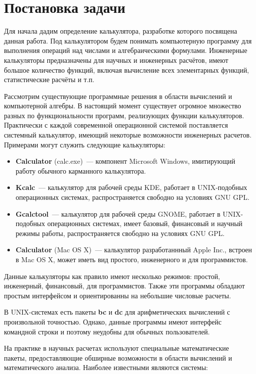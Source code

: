 \section{Постановка задачи}
Для начала дадим определение калькулятора, разработке 
которого посвящена данная работа. Под калькулятором будем 
понимать компьютерную программу для выполнения операций над числами 
и алгебраическими формулами. Инженерные калькуляторы 
предназначены для научных и инженерных расчётов, 
имеют большое количество функций, включая вычисление 
всех элементарных функций, статистические расчёты и т.п.

Рассмотрим существующие программные решения в области 
вычислений и компьютерной алгебры. В настоящий момент 
существует огромное множество разных по функциональности 
программ, реализующих функции калькуляторов. 
Практически с каждой современной операционной системой 
поставляется системный калькулятор, имеющий некоторые 
возможности инженерных расчетов. Примерами могут служить 
следующие калькуляторы:
\begin{itemize}
\item {\bf Calculator} (calc.exe)~--- компонент Microsoft Windows, имитирующий работу обычного карманного калькулятора.
\item {\bf Kcalc}~--- калькулятор для рабочей среды KDE, работает в UNIX-подобных операционных системах, распространяется свободно на условиях GNU GPL.
\item {\bf Gcalctool}~--- калькулятор для рабочей среды GNOME, работает в UNIX-подобных операционных системах, имеет базовый, финансовый и научный режимы работы, распространяется свободно на условиях GNU GPL.
\item {\bf Calculator} (Mac OS X)~--- калькулятор разработаннный Apple Inc., 
встроен в Mac OS X, может иметь вид простого, инженерного и для программистов.
\end{itemize}
Данные калькуляторы как правило имеют несколько режимов: простой, инженерный,
финансовый, для программистов. Также эти программы обладают простым 
интерфейсом и ориентированны на небольшие числовые расчеты.

В UNIX-системах есть пакеты {\bf bc} и {\bf dc} для арифметических 
вычислений с произвольной точностью. Однако, данные программы имеют 
интерфейс командной строки и поэтому неудобны для обычных пользователей. 

На практике в научных расчетах используют специальные математические пакеты, 
предоставляющие обширные возможности в области вычислений и 
математического анализа. Наиболее известными являются системы:

